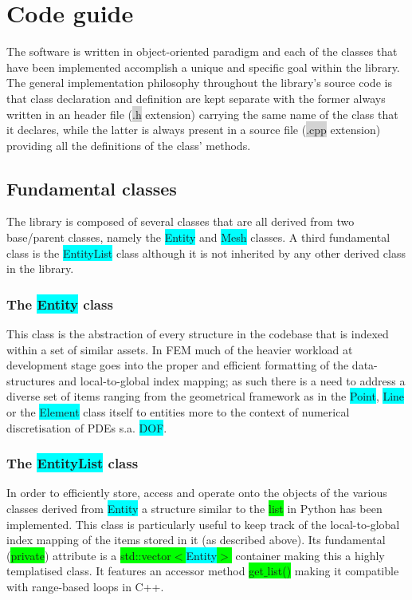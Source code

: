 \documentclass[11pt]{article}
\begin{document}
\section{Code guide}
\noindent
The software is written in object-oriented paradigm and each of the classes that have been implemented accomplish a unique and specific goal within the library. The general implementation philosophy throughout the library's source code is that class declaration and definition are kept separate with the former always written in an header file (\colorbox{lightgray}{.h} extension) carrying the same name of the class that it declares, while the latter is always present in a source file (\colorbox{lightgray}{.cpp} extension) providing all the definitions of the class' methods.

\subsection{Fundamental classes}
The library is composed of several classes that are all derived from two base/parent classes, namely the \colorbox{cyan}{Entity} and \colorbox{cyan}{Mesh} classes. A third fundamental class is the \colorbox{cyan}{EntityList} class although it is not inherited by any other derived class in the library.

\subsubsection{The \colorbox{cyan}{Entity} class}
This class is the abstraction of every structure in the codebase that is indexed within a set of similar assets. In FEM much of the heavier workload at development stage goes into the proper and efficient formatting of the data-structures and local-to-global index mapping; as such there is a need to address a diverse set of items ranging from the geometrical framework as in the \colorbox{cyan}{Point}, \colorbox{cyan}{Line} or the \colorbox{cyan}{Element} class itself to entities more to the context of numerical discretisation of PDEs s.a. \colorbox{cyan}{DOF}.

\subsubsection{The \colorbox{cyan}{EntityList} class}
In order to efficiently store, access and operate onto the objects of the various classes derived from \colorbox{cyan}{Entity} a structure similar to the \colorbox{lime}{list} in Python has been implemented. This class is particularly useful to keep track of the local-to-global index mapping of the items stored in it (as described above). Its fundamental (\colorbox{lime}{private}) attribute is a \colorbox{lime}{std::vector$<$}\colorbox{cyan}{Entity}\colorbox{lime}{$>$} container making this a highly templatised class. It features an accessor method \colorbox{lime}{get$\_$list()} making it compatible with range-based loops in C++.
\end{document}
